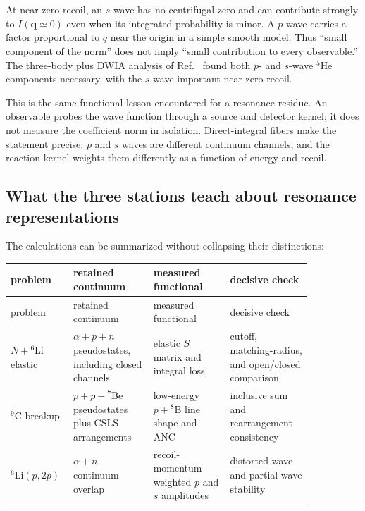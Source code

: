 At near-zero recoil, an $s$ wave has no centrifugal zero and can contribute
strongly to $\widetilde I(\bm q\simeq0)$ even when its integrated probability
is minor.  A $p$ wave carries a factor proportional to $q$ near the origin in
a simple smooth model.  Thus ``small component of the norm'' does not imply
``small contribution to every observable.''  The three-body plus DWIA
analysis of Ref.~\cite{Ogawa:2024He5} found both $p$- and $s$-wave $^5$He
components necessary, with the $s$ wave important near zero recoil.

This is the same functional lesson encountered for a resonance residue.  An
observable probes the wave function through a source and detector kernel; it
does not measure the coefficient norm in isolation.  Direct-integral fibers
make the statement precise: $p$ and $s$ waves are different continuum
channels, and the reaction kernel weights them differently as a function of
energy and recoil.

\subsection{What the three stations teach about resonance representations}
\label{subsec:lab-nuclear-resonance-lessons}

The calculations can be summarized without collapsing their distinctions:
\begin{longtable}{@{}p{0.18\linewidth}p{0.23\linewidth}p{0.22\linewidth}p{0.22\linewidth}@{}}
\toprule
problem & retained continuum & measured functional & decisive check\\
\midrule
\endfirsthead
\toprule
problem & retained continuum & measured functional & decisive check\\
\midrule
\endhead
$N+{}^6$Li elastic & $\alpha+p+n$ pseudostates, including closed channels &
elastic $S$ matrix and integral loss & cutoff, matching-radius, and open/closed comparison\\
\addlinespace
$^9$C breakup & $p+p+{}^7$Be pseudostates plus CSLS arrangements &
low-energy $p+{}^8$B line shape and ANC & inclusive sum and rearrangement consistency\\
\addlinespace
$^6$Li$(p,2p)$ & $\alpha+n$ continuum overlap &
recoil-momentum-weighted $p$ and $s$ amplitudes & distorted-wave and partial-wave stability\\
\bottomrule
\end{longtable}


